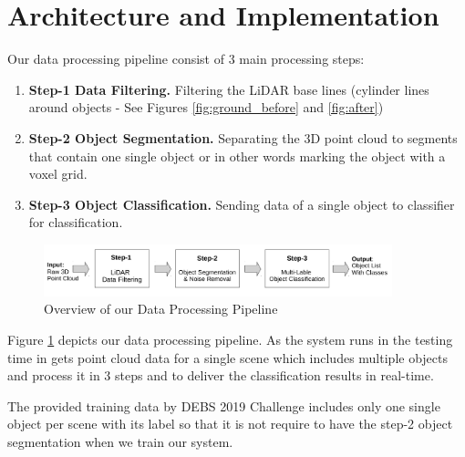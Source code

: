 \section{Architecture and Implementation}\label{sec:Architecture}

Our data processing pipeline consist of 3 main processing steps: 

\begin{enumerate}
  \item \textbf{Step-1 Data Filtering. } Filtering the LiDAR base lines (cylinder lines around objects - See Figures \ref{fig:ground_before} and \ref{fig:after})
  
  \item \textbf{Step-2 Object Segmentation.} Separating the 3D point cloud to segments that contain one single object or in other words marking the object with a voxel grid.
    
  \item \textbf{Step-3 Object Classification.}  Sending data of a single object to classifier for classification.  
\end{enumerate}

\begin{figure}[!h]
 \begin{center}
   \includegraphics[width=0.9\textwidth]{./images/DataProcessingPipleline.pdf}
   \caption{Overview of our Data Processing Pipeline}
   \label{fig:dataPipeline}
 \end{center}
\end{figure}


Figure \ref{fig:dataPipeline} depicts our data processing pipeline. As the system runs in the testing time in gets point cloud data for a single scene which includes multiple objects and process it in 3 steps and to deliver the classification results in real-time.   

The provided training data by DEBS 2019 Challenge \cite{DEBSGC2019} includes only one single object per scene with its label so that it is not require to have the step-2 object segmentation when we train our system.






